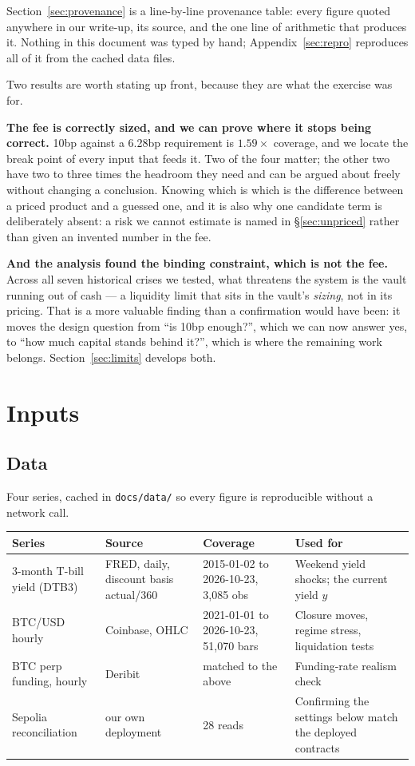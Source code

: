 \documentclass[11pt,a4paper]{article}
\begin{document}
Section~\ref{sec:provenance} is a line-by-line provenance table: every figure quoted
anywhere in our write-up, its source, and the one line of arithmetic that produces it.
Nothing in this document was typed by hand; Appendix~\ref{sec:repro} reproduces all of it
from the cached data files.

Two results are worth stating up front, because they are what the exercise was for.

\textbf{The fee is correctly sized, and we can prove where it stops being correct.} 10bp
against a 6.28bp requirement is $1.59\times$ coverage, and we locate the break point of
every input that feeds it. Two of the four matter; the other two have two to three times
the headroom they need and can be argued about freely without changing a conclusion.
Knowing which is which is the difference between a priced product and a guessed one, and
it is also why one candidate term is deliberately absent: a risk we cannot estimate is
named in \S\ref{sec:unpriced} rather than given an invented number in the fee.

\textbf{And the analysis found the binding constraint, which is not the fee.} Across all
seven historical crises we tested, what threatens the system is the vault running out of
cash — a liquidity limit that sits in the vault's \emph{sizing}, not in its pricing. That
is a more valuable finding than a confirmation would have been: it moves the design
question from ``is 10bp enough?'', which we can now answer yes, to ``how much capital
stands behind it?'', which is where the remaining work belongs. Section~\ref{sec:limits}
develops both.

\section{Inputs}

\subsection{Data}

Four series, cached in \texttt{docs/data/} so every figure is reproducible without a
network call.

\begin{center}
\small
\begin{tabular}{@{}p{3.6cm}p{3.1cm}p{3.0cm}p{4.6cm}@{}}
\toprule
\textbf{Series} & \textbf{Source} & \textbf{Coverage} & \textbf{Used for} \\
\midrule
3-month T-bill yield (DTB3) & FRED, daily, discount basis actual/360 & 2015-01-02 to 2026-10-23, 3{,}085 obs & Weekend yield shocks; the current yield $y$ \\
BTC/USD hourly & Coinbase, OHLC & 2021-01-01 to 2026-10-23, 51{,}070 bars & Closure moves, regime stress, liquidation tests \\
BTC perp funding, hourly & Deribit & matched to the above & Funding-rate realism check \\
Sepolia reconciliation & our own deployment & 28 reads & Confirming the settings below match the deployed contracts \\
\bottomrule
\end{tabular}
\end{center}
\end{document}
